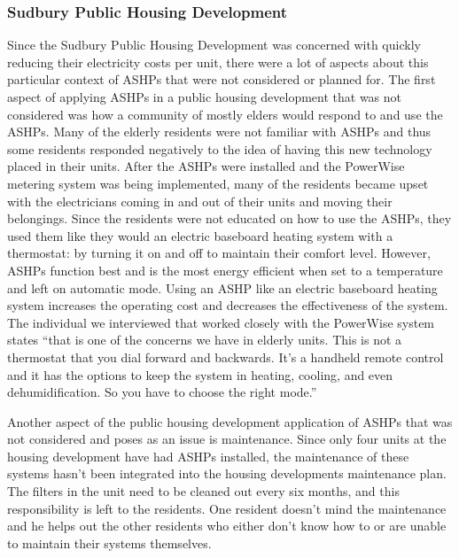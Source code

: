 \subsubsection{Sudbury Public Housing Development}
\par Since the Sudbury Public Housing Development was concerned with quickly reducing their electricity costs per unit, there were a lot of aspects about this particular context of ASHPs that were not considered or planned for. The first aspect of applying ASHPs in a public housing development that was not considered was how a community of mostly elders would respond to and use the ASHPs. Many of the elderly residents were not familiar with ASHPs and thus some residents responded negatively to the idea of having this new technology placed in their units. After the ASHPs were installed and the PowerWise metering system was being implemented, many of the residents became upset with the electricians coming in and out of their units and moving their belongings. Since the residents were not educated on how to use the ASHPs, they used them like they would an electric baseboard heating system with a thermostat: by turning it on and off to maintain their comfort level. However, ASHPs function best and is the most energy efficient when set to a temperature and left on automatic mode. Using an ASHP like an electric baseboard heating system increases the operating cost and decreases the effectiveness of the system. The individual we interviewed that worked closely with the PowerWise system states “that is one of the concerns we have in elderly units. This is not a thermostat that you dial forward and backwards. It’s a handheld remote control and it has the options to keep the system in heating, cooling, and even dehumidification. So you have to choose the right mode.”
\par Another aspect of the public housing development application of ASHPs that was not considered and poses as an issue is maintenance. Since only four units at the housing development have had ASHPs installed, the maintenance of these systems hasn’t been integrated into the housing developments maintenance plan. The filters in the unit need to be cleaned out every six months, and this responsibility is left to the residents. One resident doesn’t mind the maintenance and he helps out the other residents who either don’t know how to or are unable to maintain their systems themselves.

